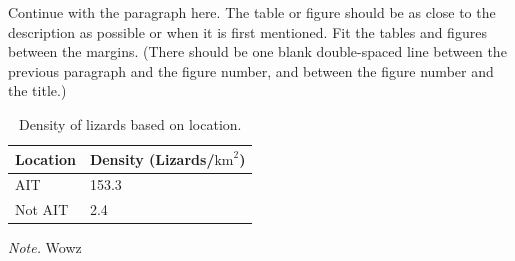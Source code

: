 Continue with the paragraph here.  The table or figure should be as close to the description as possible or when it is first mentioned. Fit the tables and figures between the margins.
(There should be one blank double-spaced line between the previous paragraph and the figure number, and between the figure number and the title.)

\begin{table}[]
\caption{Density of lizards based on location.}
\begin{center}
\begin{tabular}{|l|l|}
\hline
    Location & Density (Lizards/$\text{km}^2$) \\ \hline
AIT      & 153.3                \\ \hline
Not AIT  & 2.4                  \\ \hline
\end{tabular}
\label{tab:dense}
\end{center}
\small{\textit{Note.} Wowz}
\end{table}
